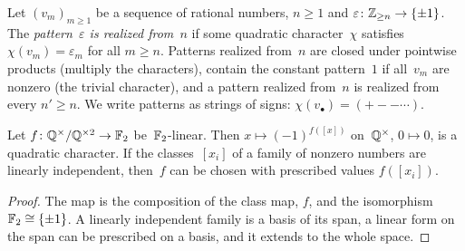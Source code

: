 \begin{definition}[Patterns]
  \label{def:pattern}
  \leanok
  Let $(v_m)_{m \ge 1}$ be a sequence of rational numbers, $n \ge 1$ and
  $\varepsilon \colon \mathbb{Z}_{\ge n} \to \{\pm 1\}$. The \emph{pattern~$\varepsilon$ is realized
  from~$n$} if some quadratic character~$\chi$ satisfies $\chi(v_m) = \varepsilon_m$ for all
  $m \ge n$. Patterns realized from~$n$ are closed under pointwise products (multiply the
  characters), contain the constant pattern~$1$ if all~$v_m$ are nonzero (the trivial
  character), and a pattern realized from~$n$ is realized from every $n' \ge n$. We write
  patterns as strings of signs: $\chi(v_\bullet) = ({+}{-}{-}\cdots)$.
\end{definition}

\begin{lemma}
  \label{lem:dual}
  \leanok
  Let $f \colon \mathbb{Q}^\times/\mathbb{Q}^{\times 2} \to \mathbb{F}_2$ be~$\mathbb{F}_2$-linear. Then
  $x \mapsto (-1)^{f([x])}$ on~$\mathbb{Q}^\times$, $0 \mapsto 0$, is a quadratic character.
  If the classes~$[x_i]$ of a family of nonzero numbers are linearly independent, then~$f$ can be
  chosen with prescribed values $f([x_i])$.
\end{lemma}
\begin{proof}
  \leanok
  The map is the composition of the class map, $f$, and the isomorphism
  $\mathbb{F}_2 \cong \{\pm 1\}$. A linearly independent family is a basis of its span, a linear form
  on the span can be prescribed on a basis, and it extends to the whole space.
\end{proof}

